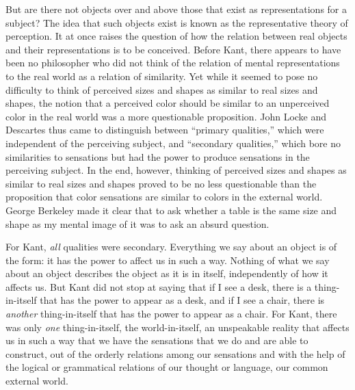 \documentclass[12pt]{article}
\begin{document}
But are there not objects over and above those that exist as representations for a subject?  The idea that such objects exist is known as the {representative theory of perception}. It at once raises the question of how the relation between real objects and their representations is to be conceived. Before Kant, there appears to have been no philosopher who did not think of the relation of mental representations to the real world as a relation of similarity. Yet while it seemed to pose no difficulty to think of perceived sizes and shapes as similar to real sizes and shapes, the notion that a perceived color should be similar to an unperceived color in the real world was a more questionable proposition. John Locke and Descartes thus came to distinguish between ``primary qualities,'' which were independent of the perceiving subject, and ``secondary qualities,'' which bore no similarities to sensations but had the power to produce sensations in the perceiving subject. In the end, however, thinking of perceived sizes and shapes as similar to real sizes and shapes proved to be no less questionable than the proposition that color sensations are similar to colors in the external world. George Berkeley made it clear that to ask whether a table is the same size and shape as my mental image of it was to ask an absurd question.

For Kant, \emph{all} qualities were secondary. Everything we say about an object is of the form: it has the power to affect us in such a way. Nothing of what we say about an object describes the object as it is in itself, independently of how it affects us. But Kant did not stop at saying that if I see a desk, there is a thing-in-itself that has the power to appear as a desk, and if I see a chair, there is \emph{another} thing-in-itself that has the power to appear as a chair. For Kant, there was only \emph{one} {thing-in-itself}, the {world-in-itself}, an unspeakable reality that affects us in such a way that we have the sensations that we do and are able to construct, out of the orderly relations among our sensations and with the help of the logical or grammatical relations of our thought or language, our common external world.
\end{document}
